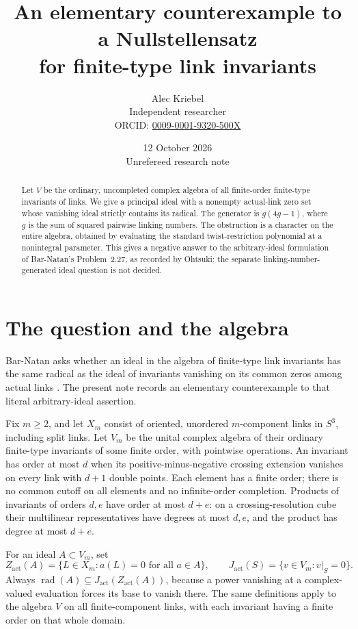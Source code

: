 \documentclass[11pt]{article}
\title{An elementary counterexample to a Nullstellensatz\\
for finite-type link invariants}
\author{Alec Kriebel\\
\small Independent researcher\\
\small ORCID: \href{https://orcid.org/0009-0001-9320-500X}{0009-0001-9320-500X}}
\date{12 October 2026\\\small Unrefereed research note}
\newcommand{\rad}{\operatorname{rad}}
\newcommand{\Zact}{Z_{\mathrm{act}}}
\newcommand{\Jact}{J_{\mathrm{act}}}
\begin{document}
\maketitle
\begin{abstract}
Let \(V\) be the ordinary, uncompleted complex algebra of all finite-order
finite-type invariants of links. We give a principal ideal with a nonempty
actual-link zero set whose vanishing ideal strictly contains its radical.
The generator is \(g(4g-1)\), where \(g\) is the sum of squared pairwise
linking numbers. The obstruction is a character on the entire algebra,
obtained by evaluating the standard twist-restriction polynomial at a
nonintegral parameter. This gives a negative answer to the arbitrary-ideal
formulation of Bar-Natan's Problem~2.27, as recorded by Ohtsuki; the separate
linking-number-generated ideal question is not decided.
\end{abstract}

\section{The question and the algebra}
Bar-Natan asks whether an ideal in the algebra of finite-type link
invariants has the same radical as the ideal of invariants vanishing on its
common zeros among actual links \cite[Problem~2.27, p.~422]{Ohtsuki}.
The present note records an elementary counterexample to that literal
arbitrary-ideal assertion.

Fix \(m\geq2\), and let \(X_m\) consist of oriented, unordered
\(m\)-component links in \(S^3\), including split links. Let \(V_m\) be the
unital complex algebra of their ordinary finite-type invariants of some
finite order, with pointwise operations. An invariant has order at most
\(d\) when its positive-minus-negative crossing extension vanishes on
every link with \(d+1\) double points. Each element has a finite order;
there is no common cutoff on all elements and no infinite-order completion.
Products of invariants of orders \(d,e\) have order at most \(d+e\):
on a crossing-resolution cube their multilinear representatives have
degrees at most \(d,e\), and the product has degree at most \(d+e\).

For an ideal \(A\subset V_m\), set
\[
 \Zact(A)=\{L\in X_m:a(L)=0\text{ for all }a\in A\},\qquad
 \Jact(S)=\{v\in V_m:v|_S=0\}.
\]
Always \(\rad(A)\subseteq\Jact(\Zact(A))\), because a power
vanishing at a complex-valued evaluation forces its base to vanish there.
The same definitions apply to the algebra \(V\) on all finite-component
links, with each invariant having a finite order on that whole domain.
\end{document}
